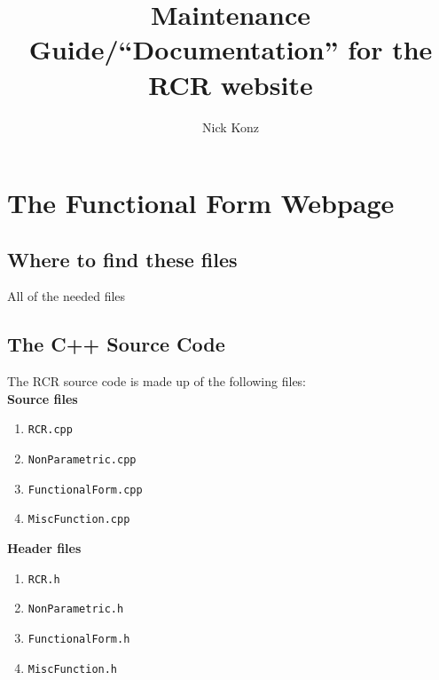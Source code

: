 \documentclass[12pt]{article}
\title{Maintenance Guide/``Documentation'' for the RCR website}
\author{Nick Konz}
\begin{document}
	
\maketitle
\section{The Functional Form Webpage}
\subsection{Where to find these files}
\par All of the needed files 
\subsection{The C++ Source Code}
\par The RCR source code is made up of the following files:
\\\textbf{Source files}
\begin{enumerate}
	\item \texttt{RCR.cpp}
	\item \texttt{NonParametric.cpp}
	\item \texttt{FunctionalForm.cpp}
	\item \texttt{MiscFunction.cpp}
\end{enumerate}
\textbf{Header files}
\begin{enumerate}
	\item \texttt{RCR.h}
	\item \texttt{NonParametric.h}
	\item \texttt{FunctionalForm.h}
	\item \texttt{MiscFunction.h}
\end{enumerate}
\end{document}
